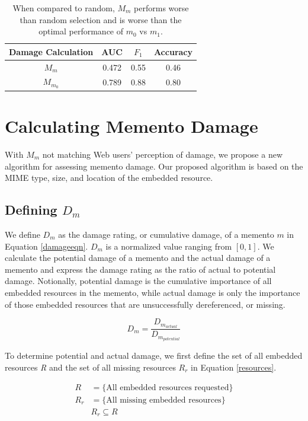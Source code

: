 \begin{table}
\centering
\begin{tabular}{ c | c | c | c }
    Damage Calculation &  AUC & $F_1$ & Accuracy\\
\hline
  $M_m$ & 0.472 & 0.55 & 0.46\\
  $M_{m_0}$ & 0.789 & 0.88 & 0.80 \\
\hline
\end{tabular}
  \caption{When compared to random, $M_m$ performs worse than random selection and is worse than the optimal performance of $m_0$ vs $m_1$.}
  \label{auc1}
\end{table}




\section{Calculating Memento Damage}
\label{damage}
With $M_m$ not matching Web users' perception of damage, we propose a new algorithm for assessing memento damage. Our proposed algorithm is based on the MIME type, size, and location of the embedded resource.

\subsection{Defining $D_m$}
We define $D_m$ as the damage rating, or cumulative damage, of a memento $m$ in Equation \ref{damageeqn}. $D_m$ is a normalized value ranging from $[0,1]$. We calculate the potential damage of a memento and the actual damage of a memento and express the damage rating as the ratio of actual to potential damage. Notionally, potential damage is the cumulative importance of all embedded resources in the memento, while actual damage is only the importance of those embedded resources that are unsuccessfully dereferenced, or missing.

\begin{equation}
\label{damageeqn}
D_m = \frac{D_{m_{actual}}}{D_{m_{potential}}}
\end{equation}

To determine potential and actual damage, we first define the set of all embedded resources \emph{R} and the set of all missing resources \emph{$R_r$} in Equation \ref{resources}.

\begin{equation}
\label{resources}
\begin{split}
R &= \{\text{All embedded resources requested}\}\\
R_r &= \{\text{All missing embedded resources}\}\\
&R_r \subseteq R
\end{split}
\end{equation}

